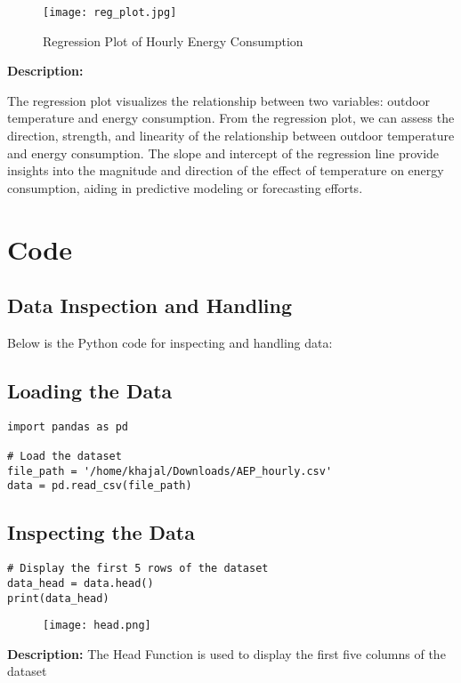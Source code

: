 \documentclass{article}
\begin{document}
\begin{figure}[H]
    \centering
    \texttt{[image: reg\_plot.jpg]}
    \caption{Regression Plot of Hourly Energy Consumption}
    \label{fig:regression_plot}
\end{figure}
\textbf{Description:}

The regression plot visualizes the relationship between two variables: outdoor temperature and energy consumption. 
From the regression plot, we can assess the direction, strength, and linearity of the relationship between outdoor temperature and energy consumption. The slope and intercept of the regression line provide insights into the magnitude and direction of the effect of temperature on energy consumption, aiding in predictive modeling or forecasting efforts.
\newpage
\section{Code}
\subsection{Data Inspection and Handling}

Below is the Python code for inspecting and handling data:

\subsection{Loading the Data}

\begin{lstlisting}[caption={Loading the dataset}]
import pandas as pd

# Load the dataset
file_path = '/home/khajal/Downloads/AEP_hourly.csv'
data = pd.read_csv(file_path)
\end{lstlisting}

\subsection{Inspecting the Data}

\begin{lstlisting}[caption={Inspecting the dataset}]
# Display the first 5 rows of the dataset
data_head = data.head()
print(data_head)
\end{lstlisting}
\begin{figure}[H]
    \centering
    \texttt{[image: head.png]}
\end{figure}
\textbf{Description:}
The Head Function is used to display the first five columns of the dataset
\end{document}
